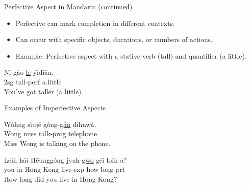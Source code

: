 \documentclass{beamer}
\newcommand{\cmn}{\mtciteform}
\newcommand{\ul}[1]{\uline{#1}}
\begin{document}
\begin{frame}{Perfective Aspect in Mandarin (continued)}
\begin{itemize}
    \item Perfective \cmn{le} can mark completion in different contexts.
    \item Can occur with specific objects, durations, or numbers of actions.
    \item Example: Perfective aspect with a stative verb (tall) and quantifier (a little).
\end{itemize}
\begin{exe}
\ex
\gll Nı̌ gǎo-\ul{le} yı̄diǎn. \\
    2sg tall-perf a.little \\
\trans You've got taller (a little). \\
\end{exe}
\end{frame}


\begin{frame}{Examples of Imperfective Aspects}
\begin{exe}
\ex
\gll Wòhng sı́ujé góng-\ul{gán} dihnwá. \\
    Wong miss talk-prog telephone \\
\trans Miss Wong is talking on the phone.\\
\end{exe}
\begin{exe}
\ex
\gll Léih hái Hēunggóng jyuh-\ul{gwo} géi loih a? \\
    you in Hong Kong live-exp how long prt \\
\trans How long did you live in Hong Kong? \\
\end{exe}
\end{frame}
\end{document}
